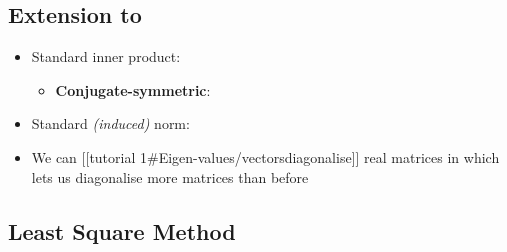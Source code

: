 \subsection*{\texorpdfstring{Extension to
}{Extension to }}

\begin{itemize}

\item
  Standard inner product:

  \begin{itemize}
  
  \item
    \textbf{Conjugate-symmetric}:
  \end{itemize}
\item
  Standard \emph{(induced)} norm:
\item
  We can {[}{[}tutorial
  1\#Eigen-values/vectors\textbar diagonalise{]}{]} real matrices in
   which lets us diagonalise more matrices than before
\end{itemize}

\subsection*{Least Square Method}


